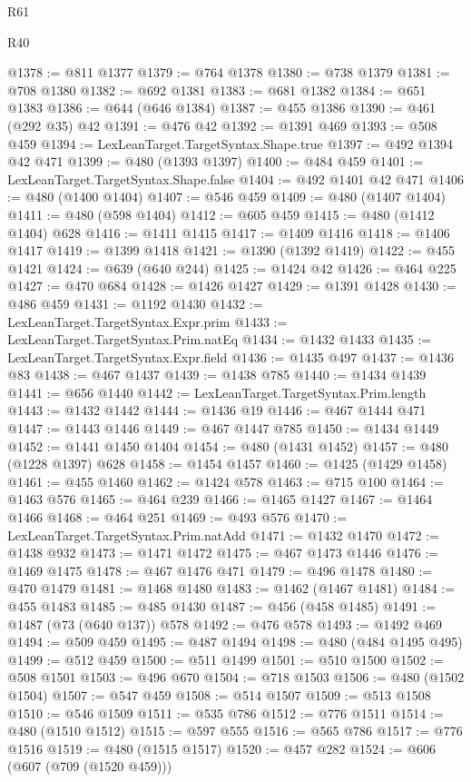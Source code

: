 \begin{lexlean}{R61}
\begin{lexlean}{R40}
\begin{coremodule}
{{{{{{{{{{{{{{{{{{{{{{{{{{{{{{{{{{{{{{{{{{{{{{{{{{{{{{{{{{{{{{{{{{{{{{{{{{{{{{{{{{{{{{{{{{{{{{{{{{{{{{{{{{{{{@1378 := @811 @1377
@1379 := @764 @1378
@1380 := @738 @1379
@1381 := @708 @1380
@1382 := @692 @1381
@1383 := @681 @1382
@1384 := @651 @1383
@1386 := @644 (@646 @1384)
@1387 := @455 @1386
@1390 := @461 (@292 @35) @42
@1391 := @476 @42
@1392 := @1391 @469
@1393 := @508 @459
@1394 := LexLeanTarget.TargetSyntax.Shape.true
@1397 := @492 @1394 @42 @471
@1399 := @480 (@1393 @1397)
@1400 := @484 @459
@1401 := LexLeanTarget.TargetSyntax.Shape.false
@1404 := @492 @1401 @42 @471
@1406 := @480 (@1400 @1404)
@1407 := @546 @459
@1409 := @480 (@1407 @1404)
@1411 := @480 (@598 @1404)
@1412 := @605 @459
@1415 := @480 (@1412 @1404) @628
@1416 := @1411 @1415
@1417 := @1409 @1416
@1418 := @1406 @1417
@1419 := @1399 @1418
@1421 := @1390 (@1392 @1419)
@1422 := @455 @1421
@1424 := @639 (@640 @244)
@1425 := @1424 @42
@1426 := @464 @225
@1427 := @470 @684
@1428 := @1426 @1427
@1429 := @1391 @1428
@1430 := @486 @459
@1431 := @1192 @1430
@1432 := LexLeanTarget.TargetSyntax.Expr.prim
@1433 := LexLeanTarget.TargetSyntax.Prim.natEq
@1434 := @1432 @1433
@1435 := LexLeanTarget.TargetSyntax.Expr.field
@1436 := @1435 @497
@1437 := @1436 @83
@1438 := @467 @1437
@1439 := @1438 @785
@1440 := @1434 @1439
@1441 := @656 @1440
@1442 := LexLeanTarget.TargetSyntax.Prim.length
@1443 := @1432 @1442
@1444 := @1436 @19
@1446 := @467 @1444 @471
@1447 := @1443 @1446
@1449 := @467 @1447 @785
@1450 := @1434 @1449
@1452 := @1441 @1450 @1404
@1454 := @480 (@1431 @1452)
@1457 := @480 (@1228 @1397) @628
@1458 := @1454 @1457
@1460 := @1425 (@1429 @1458)
@1461 := @455 @1460
@1462 := @1424 @578
@1463 := @715 @100
@1464 := @1463 @576
@1465 := @464 @239
@1466 := @1465 @1427
@1467 := @1464 @1466
@1468 := @464 @251
@1469 := @493 @576
@1470 := LexLeanTarget.TargetSyntax.Prim.natAdd
@1471 := @1432 @1470
@1472 := @1438 @932
@1473 := @1471 @1472
@1475 := @467 @1473 @1446
@1476 := @1469 @1475
@1478 := @467 @1476 @471
@1479 := @496 @1478
@1480 := @470 @1479
@1481 := @1468 @1480
@1483 := @1462 (@1467 @1481)
@1484 := @455 @1483
@1485 := @485 @1430
@1487 := @456 (@458 @1485)
@1491 := @1487 (@73 (@640 @137)) @578
@1492 := @476 @578
@1493 := @1492 @469
@1494 := @509 @459
@1495 := @487 @1494
@1498 := @480 (@484 @1495 @495)
@1499 := @512 @459
@1500 := @511 @1499
@1501 := @510 @1500
@1502 := @508 @1501
@1503 := @496 @670
@1504 := @718 @1503
@1506 := @480 (@1502 @1504)
@1507 := @547 @459
@1508 := @514 @1507
@1509 := @513 @1508
@1510 := @546 @1509
@1511 := @535 @786
@1512 := @776 @1511
@1514 := @480 (@1510 @1512)
@1515 := @597 @555
@1516 := @565 @786
@1517 := @776 @1516
@1519 := @480 (@1515 @1517)
@1520 := @457 @282
@1524 := @606 (@607 (@709 (@1520 @459)))
}}}}}}}}}}}}}}}}}}}}}}}}}}}}}}}}}}}}}}}}}}}}}}}}}}}}}}}}}}}}}}}}}}}}}}}}}}}}}}}}}}}}}}}}}}}}}}}}}}}}}}}}}}}}}
\end{coremodule}
\end{lexlean}
\end{lexlean}
